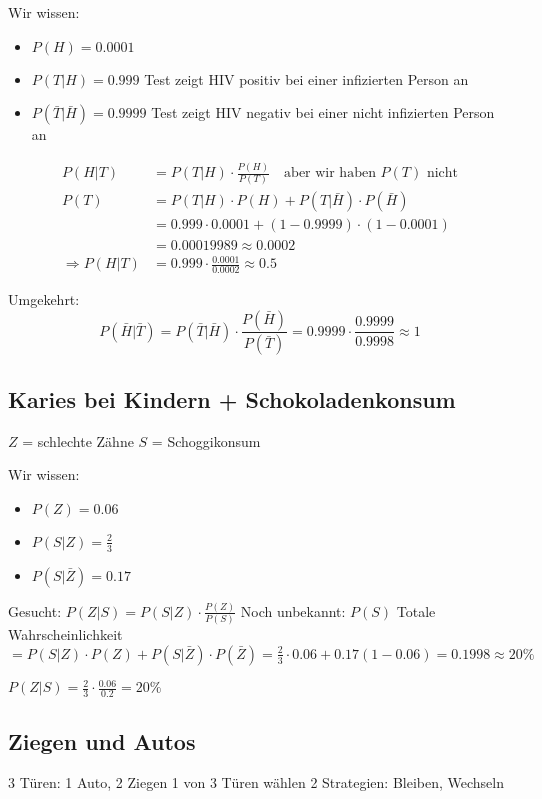 \documentclass[10pt,a4paper]{scrartcl}
\begin{document}
Wir wissen:
\begin{itemize}
\item $P(H) = 0.0001$
\item $P(T|H) = 0.999$ Test zeigt HIV positiv bei einer infizierten Person an
\item $P(\bar{T}|\bar{H}) = 0.9999$ Test zeigt HIV negativ bei einer nicht infizierten Person an
\end{itemize}

\begin{align*}
P(H|T) &= P(T|H) \cdot \frac{P(H)}{P(T)} \quad\mbox{aber wir haben } P(T) \mbox{ nicht} \\
P(T) &= P(T|H) \cdot P(H) + P(T|\bar{H}) \cdot P(\bar{H}) \\
	 &= 0.999 \cdot 0.0001 + (1-0.9999) \cdot (1-0.0001) \\
	 &= 0.00019989 \approx 0.0002 \\
\Rightarrow P(H|T) &= 0.999 \cdot \frac{0.0001}{0.0002} \approx 0.5
\end{align*}

Umgekehrt:
$$P(\bar{H}|\bar{T}) = P(\bar{T}|\bar{H}) \cdot \frac{P(\bar{H})}{P(\bar{T})}
 = 0.9999 \cdot \frac{0.9999}{0.9998} \approx 1$$

\subsection{Karies bei Kindern + Schokoladenkonsum}
$Z$ = {schlechte Zähne}
$S$ = {Schoggikonsum}

Wir wissen:
\begin{itemize}
\item $P(Z) = 0.06$
\item $P(S|Z) = \frac{2}{3}$
\item $P(S|\bar{Z}) = 0.17$
\end{itemize}

Gesucht: $P(Z|S) = P(S|Z) \cdot \frac{P(Z)}{P(S)}$
Noch unbekannt: $P(S)$ Totale Wahrscheinlichkeit $= P(S|Z) \cdot P(Z) + P(S|\bar{Z}) \cdot P(\bar{Z})
 = \frac{2}{3} \cdot 0.06 + 0.17 (1-0.06) = 0.1998 \approx 20\%$

 $P(Z|S) = \frac{2}{3} \cdot \frac{0.06}{0.2} = 20\%$


\subsection{Ziegen und Autos}
3 Türen: 1 Auto, 2 Ziegen
1 von 3 Türen wählen
2 Strategien: Bleiben, Wechseln
\end{document}
